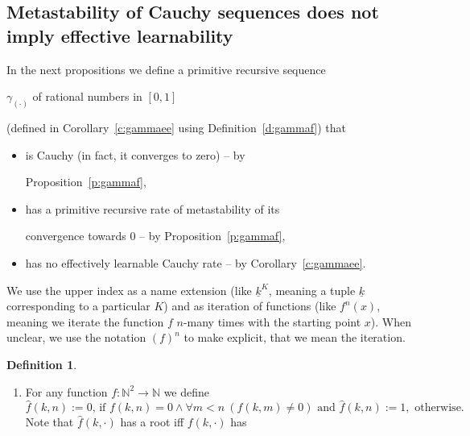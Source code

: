 \documentclass[1p]{elsarticle}
\newcommand{\NN}{\ensuremath{\mathbb{N}}}
\newcommand{\tup}{\underline} %
\theoremstyle{plain}
\theoremstyle{definition}
\newtheorem{dfn}[thm]{Definition}
\theoremstyle{remark}
\theoremstyle{definition}
\begin{document}
{\subsection{Metastability of Cauchy sequences does not imply effective learnability} \label{section4.2}



In the next propositions we define a primitive recursive sequence 

$\gamma_{(\cdot)}$ of rational numbers in $[0,1]$ 

(defined in Corollary~\ref{c:gammaee} using Definition~\ref{d:gammaf}) that

\begin{itemize}

\item is Cauchy (in fact, it converges to zero) -- by 

Proposition~\ref{p:gammaf},

\item has a primitive recursive rate of metastability of its 

convergence towards $0$ -- by Proposition~\ref{p:gammaf},

\item has no effectively learnable Cauchy rate -- by Corollary~\ref{c:gammaee}.

\end{itemize}



We use the upper index as a name extension (like $\tup k^K$, meaning a tuple $\tup k$ corresponding to a particular $K$) and as iteration of functions (like $f^n(x)$, meaning we iterate the function $f$ $n$-many times with the starting point $x$). When unclear, we use the notation $(f)^n$ to make explicit, that we mean the iteration.





\begin{dfn}\

\begin{enumerate}

\item

For any function $f:\NN^2\to \NN$ we define \[ 

\mbox{$\widehat{f}(k,n):=0$, 

if $f(k,n)=0\wedge\forall m<n\ (f(k,m)\neq 0)$ and $\widehat{f}(k,n):=1,$ 

otherwise.}\] Note that $\widehat{f}(k,\cdot)$ has a root iff $f(k,\cdot)$ has 


\end{enumerate}
\end{dfn}}
\end{document}
